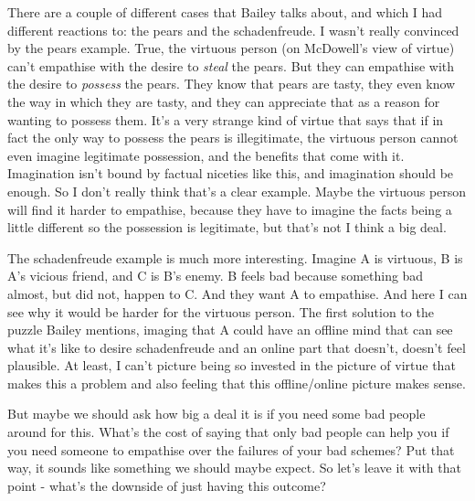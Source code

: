 \documentclass[
]{article}
\begin{document}
There are a couple of different cases that Bailey talks about, and which
I had different reactions to: the pears and the schadenfreude. I wasn't
really convinced by the pears example. True, the virtuous person (on
McDowell's view of virtue) can't empathise with the desire to
\emph{steal} the pears. But they can empathise with the desire to
\emph{possess} the pears. They know that pears are tasty, they even know
the way in which they are tasty, and they can appreciate that as a
reason for wanting to possess them. It's a very strange kind of virtue
that says that if in fact the only way to possess the pears is
illegitimate, the virtuous person cannot even imagine legitimate
possession, and the benefits that come with it. Imagination isn't bound
by factual niceties like this, and imagination should be enough. So I
don't really think that's a clear example. Maybe the virtuous person
will find it harder to empathise, because they have to imagine the facts
being a little different so the possession is legitimate, but that's not
I think a big deal.

The schadenfreude example is much more interesting. Imagine A is
virtuous, B is A's vicious friend, and C is B's enemy. B feels bad
because something bad almost, but did not, happen to C. And they want A
to empathise. And here I can see why it would be harder for the virtuous
person. The first solution to the puzzle Bailey mentions, imaging that A
could have an offline mind that can see what it's like to desire
schadenfreude and an online part that doesn't, doesn't feel plausible.
At least, I can't picture being so invested in the picture of virtue
that makes this a problem and also feeling that this offline/online
picture makes sense.

But maybe we should ask how big a deal it is if you need some bad people
around for this. What's the cost of saying that only bad people can help
you if you need someone to empathise over the failures of your bad
schemes? Put that way, it sounds like something we should maybe expect.
So let's leave it with that point - what's the downside of just having
this outcome?
\end{document}
